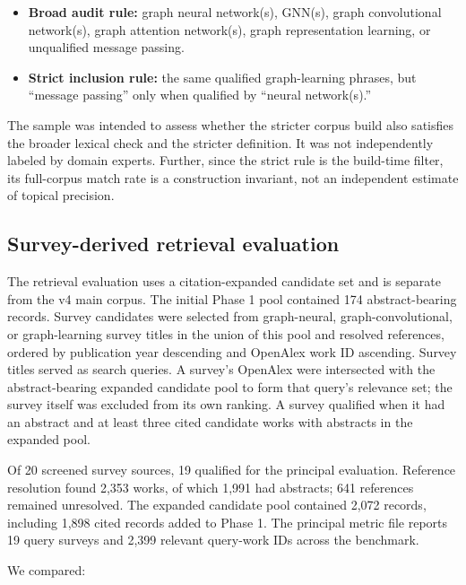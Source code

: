 \documentclass[sigconf,review,anonymous]{acmart}
\begin{document}
\begin{itemize}
\item \textbf{Broad audit rule:} graph neural network(s), GNN(s), graph convolutional network(s), graph attention network(s), graph representation learning, or unqualified message passing.
\item \textbf{Strict inclusion rule:} the same qualified graph-learning phrases, but “message passing” only when qualified by “neural network(s).”
\end{itemize}
The sample was intended to assess whether the stricter corpus build also satisfies the broader lexical check and the stricter definition. It was not independently labeled by domain experts. Further, since the strict rule is the build-time filter, its full-corpus match rate is a construction invariant, not an independent estimate of topical precision.

\subsection{Survey-derived retrieval evaluation}
The retrieval evaluation uses a citation-expanded candidate set and is separate from the v4 main corpus. The initial Phase 1 pool contained 174 abstract-bearing records. Survey candidates were selected from graph-neural, graph-convolutional, or graph-learning survey titles in the union of this pool and resolved references, ordered by publication year descending and OpenAlex work ID ascending. Survey titles served as search queries. A survey’s OpenAlex \texttt{} were intersected with the abstract-bearing expanded candidate pool to form that query’s relevance set; the survey itself was excluded from its own ranking. A survey qualified when it had an abstract and at least three cited candidate works with abstracts in the expanded pool.

Of 20 screened survey sources, 19 qualified for the principal evaluation. Reference resolution found 2,353 works, of which 1,991 had abstracts; 641 references remained unresolved. The expanded candidate pool contained 2,072 records, including 1,898 cited records added to Phase 1. The principal metric file reports 19 query surveys and 2,399 relevant query-work IDs across the benchmark.

We compared:
\end{document}
